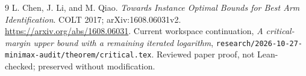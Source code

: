 \documentclass[11pt]{article}
\begin{document}
\begin{thebibliography}{9}
 L. Chen, J. Li, and M. Qiao.
\emph{Towards Instance Optimal Bounds for Best Arm Identification}.
COLT 2017; arXiv:1608.06031v2.
\url{https://arxiv.org/abs/1608.06031}.
 Current workspace continuation,
\emph{A critical-margin upper bound with a remaining iterated logarithm},
\texttt{research/2026-10-27-minimax-audit/theorem/critical.tex}.
Reviewed paper proof, not Lean-checked; preserved without modification.
\end{thebibliography}
\end{document}
